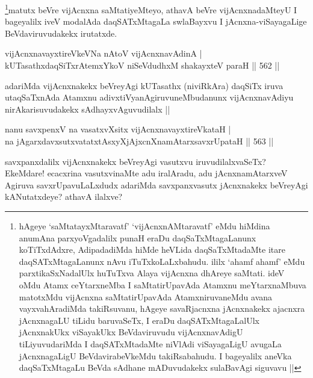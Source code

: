 \begin{artha}
\footnote{hAgeye `saMtatayxMtaravatf' `vijAcnxnAMtaravatf' eMdu hiMdina anumAna parxyoVgadalilx punaH eraDu daqSaTxMtagaLanunx koTiTxdAdxre, AdipadadiMda hiMde heVLida daqSaTxMtadaMte itare daqSATxMtagaLanunx nAvu iTuTxkoLaLxbahudu. ililx `ahamf ahamf' eMdu parxtikaSxNadalUlx huTuTxva Alaya vijAcnxna dhAreye saMtati. ideV oMdu Atamx ceYtarxneMba I saMtatirUpavAda Atamxnu meYtarxnaMbuva matotxMdu vijAcnxna saMtatirUpavAda AtamxniruvaneMdu avana vayxvahAradiMda takiRsuvanu, hAgeye savaRjacnxna jAcnxnakekx ajacnxra jAcnxnagaLU tiLidu baruvaSeTx, I eraDu daqSATxMtagaLalUlx jAcnxnakUkx viSayakUkx BeVdaviruvudu vijAcnxnavAdigU tiLiyuvudariMda I daqSATxMtadaMte niVlAdi viSayagaLigU avugaLa jAcnxnagaLigU BeVdavirabeVkeMdu takiRsabahudu. I bageyalilx aneVka daqSaTxMtagaLu BeVda sAdhane mADuvudakekx sulaBavAgi siguvavu ||}matutx beVre vijAcnxna saMtatiyeMteyo, athavA beVre vijAcnxnadaMteyU I bageyalilx iveV modalAda daqSATxMtagaLa swlaBayxvu I jAcnxna-viSayagaLige BeVdaviruvudakekx irutatxde.
\end{artha}


\begin{shl}
vijAcnxnavayxtireVkeVNa nAtoV vijAcnxnavAdinA | \\
kUTasathxdaqSiTxrAtemxYkoV niSeVdudhxM shakayxteV paraH \hfill||  562 ||  
\end{shl}

\begin{artha}
adariMda vijAcnxnakekx beVreyAgi kUTasathx (niviRkAra) daqSiTx iruva utaqSaTxnAda Atamxnu adivxtiVyanAgiruvuneMbudanunx vijAcnxnavAdiyu nirAkarisuvudakekx sAdhayxvAguvudilalx ||
\end{artha}


\begin{shl}
nanu savxpenxV na vasatxvXsitx vijAcnxnavayxtireVkataH | \\
na jAgarxdavxsutxvatatxtAsxyXjAjxcnXnamAtarxsavxrUpataH \hfill||  563 ||  
\end{shl}

\begin{artha}
savxpanxdalilx vijAcnxnakekx beVreyAgi vasutxvu iruvudilalxvaSeTx? EkeMdare! ecacxrina vasutxvinaMte adu iralAradu, adu jAcnxnamAtarxveV Agiruva savxrUpavuLaLxdudx adariMda savxpanxvasutx jAcnxnakekx beVreyAgi kANutatxdeye? athavA ilalxve?
\end{artha}

